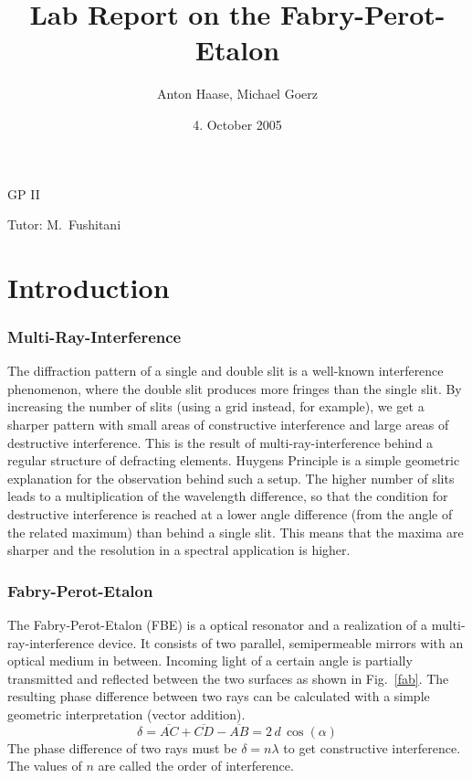 \documentclass[a4paper,10pt]{article}
\title{Lab Report on the Fabry-Perot-Etalon}
\author{Anton Haase, Michael Goerz}
\date{4. October 2005}
\begin{document}
\maketitle
\noindent GP II

\noindent Tutor: M.~Fushitani

\section{Introduction}
\subsubsection*{Multi-Ray-Interference}
The diffraction pattern of a single and double slit is a well-known interference phenomenon, where the double slit produces more fringes than the single slit. By increasing the number of slits (using a grid instead, for example), we get a sharper pattern with small areas of constructive interference and large areas of destructive interference. This is the result of multi-ray-interference behind a regular structure of defracting elements. Huygens Principle is a simple geometric explanation for the observation behind such a setup. The higher number of slits leads to a multiplication of the wavelength difference, so that the condition for destructive interference is reached at a lower angle difference (from the angle of the related maximum) than behind a single slit. This means that the maxima are sharper and the resolution in a spectral application is higher.

\subsubsection*{Fabry-Perot-Etalon}
The Fabry-Perot-Etalon (FBE) is a optical resonator and a realization of a multi-ray-interference device. It consists of two parallel, semipermeable mirrors with an optical medium in between. Incoming light of a certain angle is partially transmitted and reflected between the two surfaces as shown in Fig.~\ref{fab}. The resulting phase difference between two rays can be calculated with a simple geometric interpretation (vector addition).
\begin{equation}
\delta = \overline{AC} + \overline{CD} -\overline{AB} = 2 \, d\,  \cos(\alpha)
\end{equation}
The phase difference of two rays must be $\delta = n \lambda$ to get constructive interference. The values of $n$ are called the order of interference.
\end{document}
